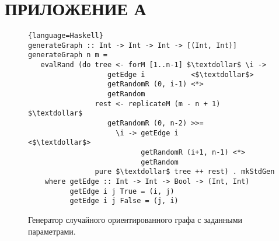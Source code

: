 \section*{ПРИЛОЖЕНИЕ А}

%
%


\begin{figure}[h!]
\begin{lstlisting}{language=Haskell}
generateGraph :: Int -> Int -> Int -> [(Int, Int)]
generateGraph n m =
   evalRand (do tree <- forM [1..n-1] $\textdollar$ \i ->
                   getEdge i           <$\textdollar$>
                   getRandomR (0, i-1) <*>
                   getRandom
                rest <- replicateM (m - n + 1) $\textdollar$
                   getRandomR (0, n-2) >>=
                     \i -> getEdge i             <$\textdollar$>
                           getRandomR (i+1, n-1) <*>
                           getRandom
                pure $\textdollar$ tree ++ rest) . mkStdGen
    where getEdge :: Int -> Int -> Bool -> (Int, Int)
          getEdge i j True = (i, j)
          getEdge i j False = (j, i)
\end{lstlisting}
\caption{Генератор случайного ориентированного графа с заданными параметрами.}
\label{fig:graphGen}
\end{figure}
